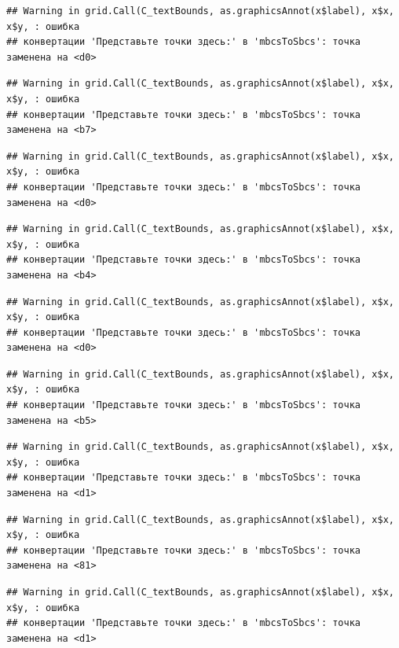 \documentclass[]{book}
\begin{document}
\begin{verbatim}
## Warning in grid.Call(C_textBounds, as.graphicsAnnot(x$label), x$x, x$y, : ошибка
## конвертации 'Представьте точки здесь:' в 'mbcsToSbcs': точка заменена на <d0>
\end{verbatim}

\begin{verbatim}
## Warning in grid.Call(C_textBounds, as.graphicsAnnot(x$label), x$x, x$y, : ошибка
## конвертации 'Представьте точки здесь:' в 'mbcsToSbcs': точка заменена на <b7>
\end{verbatim}

\begin{verbatim}
## Warning in grid.Call(C_textBounds, as.graphicsAnnot(x$label), x$x, x$y, : ошибка
## конвертации 'Представьте точки здесь:' в 'mbcsToSbcs': точка заменена на <d0>
\end{verbatim}

\begin{verbatim}
## Warning in grid.Call(C_textBounds, as.graphicsAnnot(x$label), x$x, x$y, : ошибка
## конвертации 'Представьте точки здесь:' в 'mbcsToSbcs': точка заменена на <b4>
\end{verbatim}

\begin{verbatim}
## Warning in grid.Call(C_textBounds, as.graphicsAnnot(x$label), x$x, x$y, : ошибка
## конвертации 'Представьте точки здесь:' в 'mbcsToSbcs': точка заменена на <d0>
\end{verbatim}

\begin{verbatim}
## Warning in grid.Call(C_textBounds, as.graphicsAnnot(x$label), x$x, x$y, : ошибка
## конвертации 'Представьте точки здесь:' в 'mbcsToSbcs': точка заменена на <b5>
\end{verbatim}

\begin{verbatim}
## Warning in grid.Call(C_textBounds, as.graphicsAnnot(x$label), x$x, x$y, : ошибка
## конвертации 'Представьте точки здесь:' в 'mbcsToSbcs': точка заменена на <d1>
\end{verbatim}

\begin{verbatim}
## Warning in grid.Call(C_textBounds, as.graphicsAnnot(x$label), x$x, x$y, : ошибка
## конвертации 'Представьте точки здесь:' в 'mbcsToSbcs': точка заменена на <81>
\end{verbatim}

\begin{verbatim}
## Warning in grid.Call(C_textBounds, as.graphicsAnnot(x$label), x$x, x$y, : ошибка
## конвертации 'Представьте точки здесь:' в 'mbcsToSbcs': точка заменена на <d1>
\end{verbatim}
\end{document}
